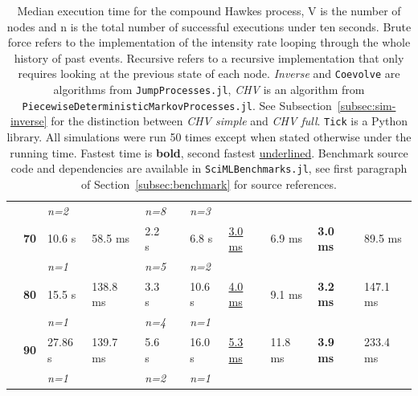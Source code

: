 \documentclass{juliacon}
\numberwithin{equation}{section}
\begin{document}
\begin{table}
\begin{tabular*}{\linewidth}{@{\extracolsep{\fill}} cllllllllll}
                                &             & \textit{n=2}      &                             & \textit{n=8}        & & \textit{n=3}     &                               &                                 &                              &                              \\
                                & \textbf{70} & 10.6 s            & 58.5 ms                     & 2.2 s               & & 6.8 s            & \underline{3.0 ms}            &  6.9 ms                         & \textbf{3.0 ms}              & 89.5 ms                      \\
                                &             & \textit{n=1}      &                             & \textit{n=5}        & & \textit{n=2}     &                               &                                 &                              &                              \\
                                & \textbf{80} & 15.5 s            & 138.8 ms                    & 3.3 s               & & 10.6 s           & \underline{4.0 ms}            &  9.1 ms                         & \textbf{3.2 ms}              & 147.1 ms                     \\
                                &             & \textit{n=1}      &                             & \textit{n=4}        & & \textit{n=1}     &                               &                                 &                              &                              \\
                                & \textbf{90} & 27.86 s           & 139.7 ms                    & 5.6 s               & & 16.0 s           & \underline{5.3 ms}            &  11.8 ms                        & \textbf{3.9 ms}              & 233.4 ms                     \\
                                &             & \textit{n=1}      &                             & \textit{n=2}        & & \textit{n=1}     &                               &                                 &                              &                              \\
\bottomrule
\end{tabular*}
\caption{Median execution time for the compound Hawkes process, V is the number of nodes and n is the total number of successful executions under ten seconds. Brute force refers to the implementation of the intensity rate looping through the whole history of past events. Recursive refers to a recursive implementation that only requires looking at the previous state of each node. \textit{Inverse} and \texttt{Coevolve} are algorithms from \texttt{JumpProcesses.jl}, \textit{CHV} is an algorithm from \texttt{PiecewiseDeterministicMarkovProcesses.jl}. See Subsection~\ref{subsec:sim-inverse} for the distinction between \textit{CHV simple} and \textit{CHV full}. \texttt{Tick} is a Python library. All simulations were run 50 times except when stated otherwise under the running time. Fastest time is \textbf{bold}, second fastest \underline{underlined}. Benchmark source code and dependencies are available in \texttt{SciMLBenchmarks.jl}, see first paragraph of Section~\ref{subsec:benchmark} for source references.}

\end{table}
\end{document}
